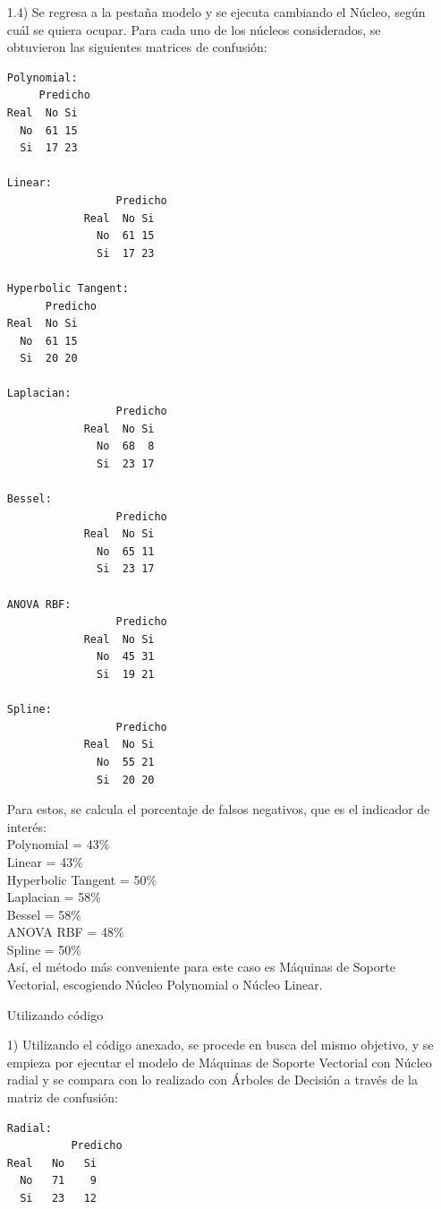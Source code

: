 \documentclass[11pt,a4paper]{report}
\begin{document}
\begin{itemize}
\item[1.4)] Se regresa a la pestaña modelo y se ejecuta cambiando el Núcleo, según cuál se quiera ocupar. Para cada uno de los núcleos considerados, se obtuvieron las siguientes matrices de confusión:
\begin{verbatim}
Polynomial:
   	 Predicho
Real  No Si
  No  61 15
  Si  17 23
 			 
Linear:
			     Predicho
			Real  No Si
			  No  61 15
			  Si  17 23 	
			  
Hyperbolic Tangent:
 	  Predicho
Real  No Si
  No  61 15
  Si  20 20		
 			  
Laplacian:
    			 Predicho
			Real  No Si
			  No  68  8
			  Si  23 17 		
			  
Bessel:
			     Predicho
			Real  No Si
			  No  65 11
			  Si  23 17		
			  
ANOVA RBF:
			     Predicho
			Real  No Si
			  No  45 31
			  Si  19 21
			  
Spline:
			     Predicho
			Real  No Si
			  No  55 21
			  Si  20 20			  			  	  	  	  		 
\end{verbatim}
Para estos, se calcula el porcentaje de falsos negativos, que es el indicador de interés:\\
Polynomial = 43\%\\
Linear = 43\%\\
Hyperbolic Tangent = 50\%\\
Laplacian = 58\%\\
Bessel = 58\%\\
ANOVA RBF = 48\%\\
Spline = 50\%\\
Así, el método más conveniente para este caso es Máquinas de Soporte Vectorial, escogiendo Núcleo Polynomial o Núcleo Linear.\\



\begin{center}
Utilizando código
\end{center}

\item[1)]
\noindent Utilizando el código anexado, se procede en busca del mismo objetivo, y se empieza por ejecutar el modelo de Máquinas de Soporte Vectorial con Núcleo radial y se compara con lo realizado con Árboles de Decisión a través de la matriz de confusión:
\begin{verbatim}
Radial:
	      Predicho
Real   No 	Si
  No   71 	 9
  Si   23 	12
  

\end{verbatim}
\end{itemize}
\end{document}
